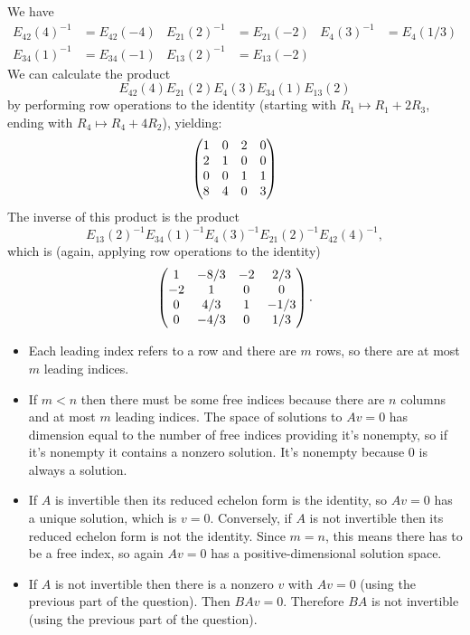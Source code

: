 \documentclass{article}
\begin{document}
\newpage


\begin{Solution}
We have
\begin{align*}
E_{42}(4)^{-1}&=E_{42}(-4)&E_{21}(2)^{-1}&=E_{21}(-2)&E_4(3)^{-1}&=E_4(1/3)\\
E_{34}(1)^{-1}&=E_{34}(-1)&E_{13}(2)^{-1}&=E_{13}(-2)& &
\end{align*}
We can calculate the product
\[E_{42}(4)E_{21}(2)E_4(3)E_{34}(1)E_{13}(2)\] by performing row
operations to the identity (starting with \(R_1\mapsto R_1+2R_3\),
ending with \(R_4\mapsto R_4+4R_2\)), yielding: \[\begin{pmatrix} 1 & 0 & 2 & 0
\\ 2 & 1 & 0 & 0 \\ 0 & 0 & 1 & 1 \\ 8 & 4 & 0 & 3\end{pmatrix}\] The inverse
of this product is the product
\[E_{13}(2)^{-1}E_{34}(1)^{-1}E_4(3)^{-1}E_{21}(2)^{-1}E_{42}(4)^{-1},\]
which is (again, applying row operations to the identity) \[\begin{pmatrix} 1 &
-8/3 & -2 & 2/3 \\ -2 & 1 & 0 & 0 \\ 0 & 4/3 & 1 & -1/3 \\ 0 & -4/3
& 0 & 1/3\end{pmatrix}.\]


\end{Solution}
\begin{Solution}
\begin{itemize}
\item Each leading index refers to a row and there are \(m\) rows, so
there are at most \(m\) leading indices.
\item If \(m<n\) then there must be some free indices because there are
\(n\) columns and at most \(m\) leading indices. The space of
solutions to \(Av=0\) has dimension equal to the number of free
indices providing it's nonempty, so if it's nonempty it contains a
nonzero solution. It's nonempty because \(0\) is always a
solution.
\item If \(A\) is invertible then its reduced echelon form is the
identity, so \(Av=0\) has a unique solution, which is
\(v=0\). Conversely, if \(A\) is not invertible then its reduced
echelon form is not the identity. Since \(m=n\), this means there
has to be a free index, so again \(Av=0\) has a
positive-dimensional solution space.
\item If \(A\) is not invertible then there is a nonzero \(v\) with
\(Av=0\) (using the previous part of the question). Then
\(BAv=0\). Therefore \(BA\) is not invertible (using the previous
part of the question).


\end{itemize}
\end{Solution}
\newpage
\end{document}
